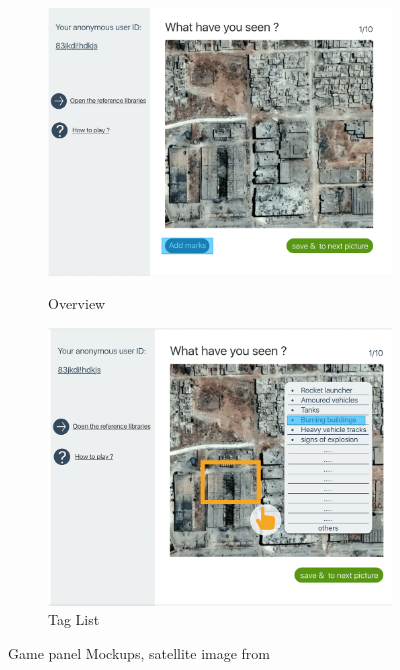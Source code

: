 \begin{figure}[H]
    \centering
    \begin{subfigure}[b]{0.45\textwidth}
        \centering
        \includegraphics[width=\textwidth]{figures/function-player-0}
        \label{fig:player0}
        \caption{Overview}
    \end{subfigure}
    \hfill
    \begin{subfigure}[b]{0.45\textwidth}
        \centering
        \includegraphics[width=\textwidth]{figures/function-player-1}
        \caption{Tag List}
        \label{fig:player1}
    \end{subfigure}
    \caption{Game panel Mockups, satellite image from  \cite{satellite-photo-1}}
\end{figure}

